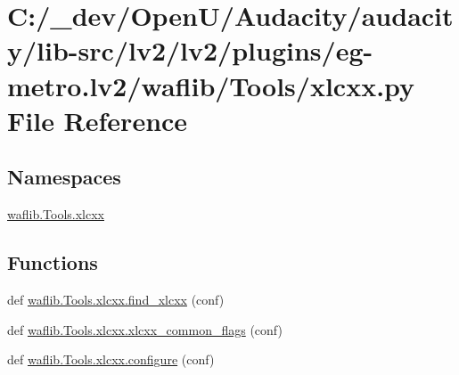 \hypertarget{lv2_2plugins_2eg-metro_8lv2_2waflib_2_tools_2xlcxx_8py}{}\section{C\+:/\+\_\+dev/\+Open\+U/\+Audacity/audacity/lib-\/src/lv2/lv2/plugins/eg-\/metro.lv2/waflib/\+Tools/xlcxx.py File Reference}
\label{lv2_2plugins_2eg-metro_8lv2_2waflib_2_tools_2xlcxx_8py}
\subsection*{Namespaces}
\begin{DoxyCompactItemize}
\item 
 \hyperlink{namespacewaflib_1_1_tools_1_1xlcxx}{waflib.\+Tools.\+xlcxx}
\end{DoxyCompactItemize}
\subsection*{Functions}
\begin{DoxyCompactItemize}
\item 
def \hyperlink{namespacewaflib_1_1_tools_1_1xlcxx_a8620e3d06d6be208c56bd82ebc223078}{waflib.\+Tools.\+xlcxx.\+find\+\_\+xlcxx} (conf)
\item 
def \hyperlink{namespacewaflib_1_1_tools_1_1xlcxx_a595cde6fb1bcdb1dea9bbabf310a807b}{waflib.\+Tools.\+xlcxx.\+xlcxx\+\_\+common\+\_\+flags} (conf)
\item 
def \hyperlink{namespacewaflib_1_1_tools_1_1xlcxx_a711febe8407f7d68502ceddf57b6a749}{waflib.\+Tools.\+xlcxx.\+configure} (conf)
\end{DoxyCompactItemize}
